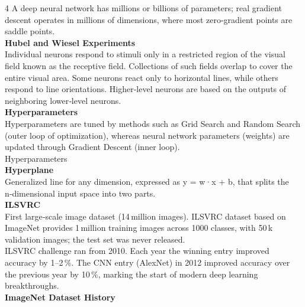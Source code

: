 \documentclass[8pt]{extarticle}
\begin{document}
\begin{multicols}{4}
A deep neural network has millions or billions of parameters; real gradient descent operates in millions of dimensions, where most zero-gradient points are saddle points.\\
\vspace{2pt}\textbf{Hubel and Wiesel Experiments}\\
Individual neurons respond to stimuli only in a restricted region of the visual field known as the receptive field. Collections of such fields overlap to cover the entire visual area. Some neurons react only to horizontal lines, while others respond to line orientations. Higher‑level neurons are based on the outputs of neighboring lower‑level neurons.\\
\vspace{2pt}\textbf{Hyperparameters}\\
Hyperparameters are tuned by methods such as Grid Search and Random Search (outer loop of optimization), whereas neural network parameters (weights) are updated through Gradient Descent (inner loop).\\
Hyperparameters\\
\vspace{2pt}\textbf{Hyperplane}\\
Generalized line for any dimension, expressed as y = w·x + b, that splits the n‑dimensional input space into two parts.\\
\vspace{2pt}\textbf{ILSVRC}\\
First large‑scale image dataset (14 million images). ILSVRC dataset based on ImageNet provides 1 million training images across 1000 classes, with 50 k validation images; the test set was never released.\\
ILSVRC challenge ran from 2010. Each year the winning entry improved accuracy by 1–2 \%. The CNN entry (AlexNet) in 2012 improved accuracy over the previous year by 10 \%, marking the start of modern deep learning breakthroughs.\\
\vspace{2pt}\textbf{ImageNet Dataset History}\\


\end{multicols}
\end{document}
